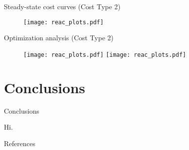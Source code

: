 \documentclass[xcolor=dvipsnames, 8pt]{beamer} %
\begin{document}
\begin{frame}{Steady-state cost curves (Cost Type 2)}

	\begin{figure}
		\centering
		\texttt{[image: reac\_plots.pdf]}
	\end{figure}

\end{frame}

\begin{frame}{Optimization analysis (Cost Type 2)}

\begin{figure}
	\centering
	\texttt{[image: reac\_plots.pdf]}
	\texttt{[image: reac\_plots.pdf]}
\end{figure}

\end{frame}

\section{Conclusions}
\begin{frame}{Conclusions}

	Hi.

\end{frame}

\begin{frame}{References}


\end{frame}
\end{document}
